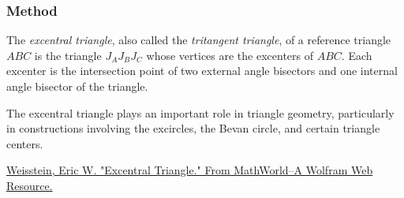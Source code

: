 \vspace{1em}

\vspace{1em}
\begin{minipage}{.5\textwidth}
\begin{center}
\end{center}
\end{minipage}
\begin{minipage}{.5\textwidth}
\begin{tkzexample}
\end{tkzexample}
\end{minipage}

\subsubsection{Method }
\label{ssub:method_triangle_excentral}

The \emph{excentral triangle}, also called the \emph{tritangent triangle}, of a reference triangle $ABC$ is the triangle $J_AJ_BJ_C$ whose vertices are the excenters of $ABC$. Each excenter is the intersection point of two external angle bisectors and one internal angle bisector of the triangle.

The excentral triangle plays an important role in triangle geometry, particularly in constructions involving the excircles, the Bevan circle, and certain triangle centers.
\begin{flushright}
\small
\href{https://mathworld.wolfram.com/ExcentralTriangle.html}{Weisstein, Eric W. "Excentral Triangle." From MathWorld--A Wolfram Web Resource.}
\end{flushright}

